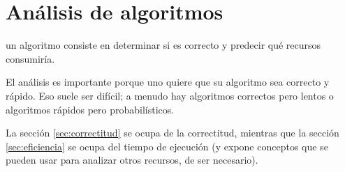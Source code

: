 \part{Análisis de algoritmos}

 un algoritmo consiste en determinar si es correcto y predecir qué recursos consumiría.

El análisis es importante porque uno quiere que su algoritmo sea correcto y rápido. Eso suele ser difícil; a menudo hay algoritmos correctos pero lentos o algoritmos rápidos pero probabilísticos.

La sección \ref{sec:correctitud} se ocupa de la correctitud, mientras que la sección \ref{sec:eficiencia} se ocupa del tiempo de ejecución (y expone conceptos que se pueden usar para analizar otros recursos, de ser necesario).


